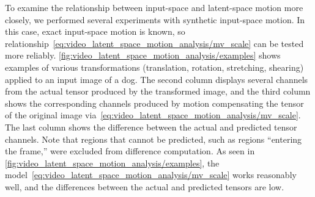 To examine the relationship between input-space and latent-space motion more closely, we performed several experiments with synthetic input-space motion. In this case, exact input-space motion is known, so relationship~\cref{eq:video_latent_space_motion_analysis/mv_scale} can be tested more reliably.  \cref{fig:video_latent_space_motion_analysis/examples} shows examples of various transformations (translation, rotation, stretching, shearing) applied to an input image of a dog. The second column displays several channels from the actual tensor produced by the transformed image, and the third column shows the corresponding channels produced by motion compensating the tensor of the original image via~\cref{eq:video_latent_space_motion_analysis/mv_scale}. The last column shows the difference between the actual and predicted tensor channels. Note that regions that cannot be predicted, such as regions ``entering the frame,'' were excluded from difference computation. As seen in \cref{fig:video_latent_space_motion_analysis/examples}, the model~\cref{eq:video_latent_space_motion_analysis/mv_scale} works reasonably well, and the differences between the actual and predicted tensors are low.



